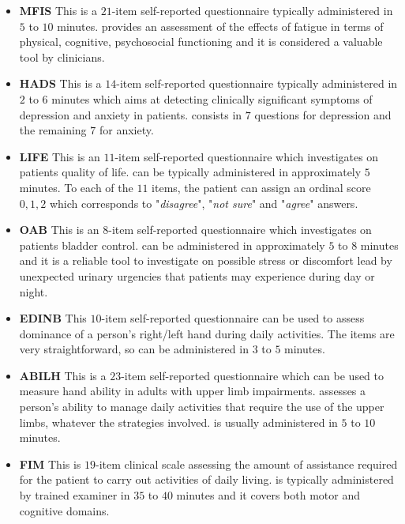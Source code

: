 \begin{itemize}
	\item[] {\sc \textbf{MFIS}} This is a $21$-item self-reported questionnaire typically administered in $5$ to $10$ minutes. \MFIS provides an assessment of the effects of fatigue in terms of physical, cognitive, psychosocial functioning and it is considered a valuable tool by clinicians.
	
	\item[] {\sc \textbf{HADS}} This is a $14$-item self-reported questionnaire typically administered in $2$ to $6$ minutes which aims at detecting clinically significant symptoms of depression and anxiety in patients. \HADS consists in $7$ questions for depression and the remaining $7$ for anxiety.
	
	\item[] {\sc \textbf{LIFE}} This is an $11$-item self-reported questionnaire which investigates on patients quality of life. \LIFE can be typically administered in approximately $5$ minutes. To each of the $11$ items, the patient can assign an ordinal score $0,1,2$ which corresponds to "\textit{disagree}", "\textit{not sure}" and "\textit{agree}" answers.
	
	\item[] {\sc \textbf{OAB}} This is an $8$-item self-reported questionnaire which investigates on patients bladder control. \OAB can be administered in approximately $5$ to $8$ minutes and it is a reliable tool to investigate on possible stress or discomfort lead by unexpected urinary urgencies that patients may experience during day or night.
	
	\item[] {\sc \textbf{EDINB}} This $10$-item self-reported questionnaire can be used to assess dominance of a person's right/left hand during daily activities. The items are very straightforward, so \EDINB can be administered in $3$ to $5$ minutes.
	
	\item[] {\sc \textbf{ABILH}} This is a $23$-item self-reported questionnaire which can be used to measure hand ability in adults with upper limb impairments. \ABILH assesses a person's ability to manage daily activities that require the use of the upper limbs, whatever the strategies involved. \ABILH is usually administered in $5$ to $10$ minutes.
	
	\item[] {\sc \textbf{FIM}} This is $19$-item clinical scale assessing the amount of assistance required for the patient to carry out activities of daily living. \FIM is typically administered by trained examiner in $35$ to $40$ minutes and it covers both motor and cognitive domains.


\end{itemize}
